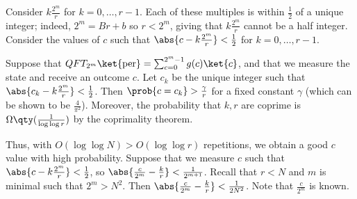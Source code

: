 Consider $k\frac{2^m}{r}$ for $k = 0, \dots, r-1$.
Each of these multiples is within $\frac{1}{2}$ of a unique integer; indeed, $2^m = Br + b$ so $r < 2^m$, giving that $k\frac{2^m}{r}$ cannot be a half integer.
Consider the values of $c$ such that $\abs{c - k \frac{2^m}{r}} < \frac{1}{2}$ for $k = 0, \dots, r-1$.
\begin{theorem}
    Suppose that $QFT_{2^m} \ket{\mathrm{per}} = \sum_{c=0}^{2^m - 1} g(c) \ket{c}$, and that we measure the state and receive an outcome $c$.
    Let $c_k$ be the unique integer such that $\abs{c_k - k\frac{2^m}{r}} < \frac{1}{2}$.
    Then $\prob{c = c_k} > \frac{\gamma}{r}$ for a fixed constant $\gamma$ (which can be shown to be $\frac{4}{\pi^2}$).
    Moreover, the probability that $k, r$ are coprime is $\Omega\qty(\frac{1}{\log \log r})$ by the coprimality theorem.
\end{theorem}
Thus, with $O(\log \log N) > O(\log \log r)$ repetitions, we obtain a good $c$ value with high probability.
Suppose that we measure $c$ such that $\abs{c - k \frac{2^m}{r}} < \frac{1}{2}$, so $\abs{\frac{c}{2^m} - \frac{k}{r}} < \frac{1}{2^{m+1}}$.
Recall that $r < N$ and $m$ is minimal such that $2^m > N^2$.
Then $\abs{\frac{c}{2^m} - \frac{k}{r}} < \frac{1}{2N^2}$.
Note that $\frac{c}{2^m}$ is known.

